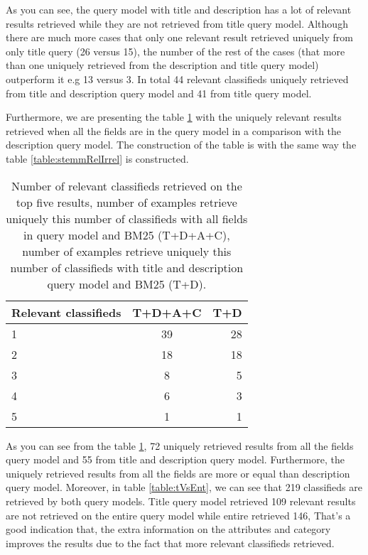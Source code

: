 As you can see, the query model with title and description has a lot of relevant results retrieved while they are not retrieved from title query model. Although there are much more cases that only one relevant result retrieved uniquely from only title query (26 versus 15), the number of the rest of the cases (that more than one uniquely retrieved from the description and title query model) outperform it e.g 13 versus 3. In total 44 relevant classifieds uniquely retrieved from title and description query model and 41 from title query model. 



Furthermore, we are presenting the table \ref{table:tVsEntRank} with the uniquely relevant results retrieved when all the fields are in the query model in a comparison with the description query model. The construction of the table is with the same way the table \ref{table:stemmRelIrrel} is constructed.

\begin{table}[H]
\begin{center}
\caption{Number of relevant classifieds retrieved on the top five results, number of examples retrieve uniquely this number of classifieds with all fields in query model and BM25 (T+D+A+C), number of examples retrieve uniquely this number of classifieds with title and description query model and BM25 (T+D).}
\label{table:tVsEntRank}
\begin{tabular}{lcr}
\midrule
Relevant classifieds &  T+D+A+C & T+D \\
\midrule
	1 & 39 & 28 \\
	2 & 18 & 18 \\
	3 & 8 & 5 \\
	4 & 6 & 3 \\
	5 & 1 & 1 \\
\bottomrule
\end{tabular}
\end{center}
\end{table}

As you can see from the table \ref{table:tVsEntRank}, 72 uniquely retrieved results from all the fields query model and 55 from title and description query model. Furthermore, the uniquely retrieved results from all the fields are more or equal than description query model. Moreover, in table \ref{table:tVsEnt}, we can see that 219 classifieds are retrieved by both query models. Title query model retrieved 109 relevant results are not retrieved on the entire query model while entire retrieved 146, That's a good indication that, the extra information on the attributes and category improves the results due to the fact that more relevant classifieds retrieved.


